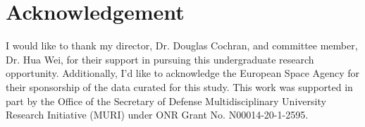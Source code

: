 
\chapter*{Acknowledgement}
I would like to thank my director, Dr. Douglas Cochran, and committee member, Dr. Hua Wei, for their support in pursuing this undergraduate research opportunity. Additionally, I'd like to acknowledge the European Space Agency for their sponsorship of the data curated for this study. This work was supported in part by the Office of the Secretary of Defense Multidisciplinary University Research Initiative (MURI) under ONR Grant No. N00014-20-1-2595.

\vspace{5em}